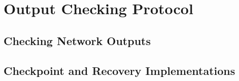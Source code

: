 \section{Output Checking Protocol} \label{sec:output}

\subsection{Checking Network Outputs} \label{sec:output-workflow}

\subsection{Checkpoint and Recovery Implementations} \label{sec:checkpoint}
